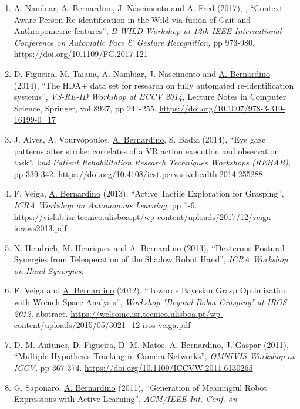 \begin{enumerate}
  of joint compliance in quadrupedal locomotion'', \emph{International
  Symposium on Adaptive Motion of Animals and Machines (AMAM),} pp 1-2.
  \url{https://infoscience.epfl.ch/record/253019?ln=en}
\item
  A. Nambiar, \ul{A. Bernardino}, J. Nascimento and A. Fred (2017), ,
  ``Context-Aware Person Re-identification in the Wild via fusion of
  Gait and Anthropometric features'', \emph{B-WILD Workshop at 12th IEEE
  International Conference on Automatic Face \& Gesture Recognition,} pp
  973-980. \url{https://doi.org/10.1109/FG.2017.121}~
\item
  D. Figueira, M. Taiana, A. Nambiar, J. Nascimento and \ul{A.
  Bernardino} (2014), ``The HDA+ data set for research on fully
  automated re-identification systems'', \emph{VS-RE-ID Workshop at ECCV
  2014,} Lecture Notes in Computer Science, Springer, vol 8927, pp
  241-255. \url{https://doi.org/10.1007/978-3-319-16199-0_17}~
\item
  J. Alves, A. Vourvopoulos, \ul{A. Bernardino}, S. Badia (2014), ``Eye
  gaze patterns after stroke: correlates of a VR action execution and
  observation task''. \emph{2nd Patient Rehabilitation Research
  Techniques Workshops (REHAB),} pp 339-342.
  \url{https://doi.org/10.4108/icst.pervasivehealth.2014.255288}~
\item
  F. Veiga, \ul{A. Bernardino} (2013), ``Active Tactile Exploration for
  Grasping'', \emph{ICRA Workshop on Autonomous Learning,} pp 1-6.
  \url{https://vislab.isr.tecnico.ulisboa.pt/wp-content/uploads/2017/12/veiga-icraws2013.pdf}~
\item
  N. Hendrich, M. Henriques and \ul{A. Bernardino} (2013), ``Dexterous
  Postural Synergies from Teleoperation of the Shadow Robot Hand'',
  \emph{ICRA Workshop on Hand Synergies}.
\item
  F. Veiga and \ul{A. Bernardino} (2012), ``Towards Bayesian Grasp
  Optimization with Wrench Space Analysis'', \emph{Workshop "Beyond
  Robot Grasping" at IROS 2012,} abstract\emph{.}
  \url{https://welcome.isr.tecnico.ulisboa.pt/wp-content/uploads/2015/05/3021_12-iros-veiga.pdf}~
\item
  D. M. Antunes, D. Figueira, D. M. Matos, \ul{A. Bernardino}, J. Gaspar
  (2011), ``Multiple Hypothesis Tracking in Camera Networks'',
  \emph{OMNIVIS Workshop at ICCV,} pp 367-374.
  \url{https://doi.org/10.1109/ICCVW.2011.6130265}~
\item
  G. Saponaro, \ul{A. Bernardino} (2011), ``Generation of Meaningful
  Robot Expressions with Active Learning'', \emph{ACM/IEEE Int. Conf. on
}
\end{enumerate}

